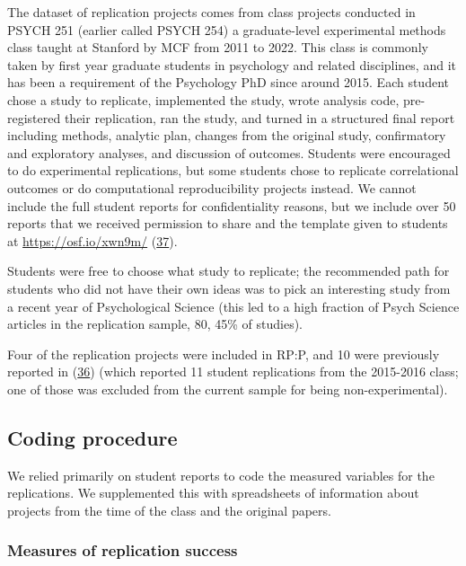 \documentclass[
  english,
  a4paper,
]{article}
\begin{document}
The dataset of replication projects comes from class projects conducted in PSYCH 251 (earlier called PSYCH 254) a graduate-level experimental methods class taught at Stanford by MCF from 2011 to 2022. This class is commonly taken by first year graduate students in psychology and related disciplines, and it has been a requirement of the Psychology PhD since around 2015. Each student chose a study to replicate, implemented the study, wrote analysis code, pre-registered their replication, ran the study, and turned in a structured final report including methods, analytic plan, changes from the original study, confirmatory and exploratory analyses, and discussion of outcomes. Students were encouraged to do experimental replications, but some students chose to replicate correlational outcomes or do computational reproducibility projects instead. We cannot include the full student reports for confidentiality reasons, but we include over 50 reports that we received permission to share and the template given to students at \url{https://osf.io/xwn9m/} (\protect\hyperlink{ref-osfdata}{37}).

Students were free to choose what study to replicate; the recommended path for students who did not have their own ideas was to pick an interesting study from a recent year of Psychological Science (this led to a high fraction of Psych Science articles in the replication sample, 80, 45\% of studies).

Four of the replication projects were included in RP:P, and 10 were previously reported in (\protect\hyperlink{ref-hawkins2018}{36}) (which reported 11 student replications from the 2015-2016 class; one of those was excluded from the current sample for being non-experimental).

\hypertarget{coding-procedure}{%
\subsection{Coding procedure}\label{coding-procedure}}

We relied primarily on student reports to code the measured variables for the replications. We supplemented this with spreadsheets of information about projects from the time of the class and the original papers.

\hypertarget{measures-of-replication-success}{%
\subsubsection{Measures of replication success}\label{measures-of-replication-success}}
\end{document}
